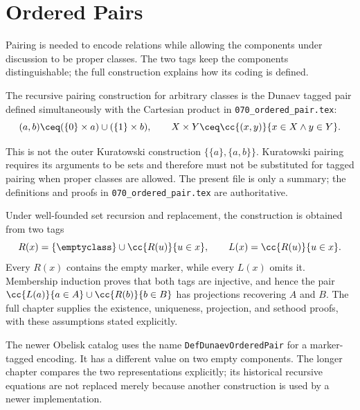 \def\topic{Ordered Pairs: Active Convention}

\section{Ordered Pairs}

Pairing is needed to encode relations while allowing the components under
discussion to be proper classes. The two tags keep the components
distinguishable; the full construction explains how its coding is defined.

The recursive pairing construction for arbitrary classes is the Dunaev tagged
pair defined simultaneously with the Cartesian product in
\texttt{070\_ordered\_pair.tex}:
\[
(a,b)\ceq(\{0\}\times a)\cup(\{1\}\times b),
\qquad
X\times Y\ceq\cc{(x,y)}{x\in X\land y\in Y}.
\]

This is not the outer Kuratowski construction
$\{\{a\},\{a,b\}\}$. Kuratowski pairing requires its arguments to be sets and
therefore must not be substituted for tagged pairing when proper classes are
allowed. The present file is only a summary; the definitions and proofs in
\texttt{070\_ordered\_pair.tex} are authoritative.

Under well-founded set recursion and replacement, the construction is
obtained from two tags
\[
R(x)=\{\emptyclass\}\cup\cc{R(u)}{u\in x},\qquad
L(x)=\cc{R(u)}{u\in x}.
\]
Every $R(x)$ contains the empty marker, while every $L(x)$ omits it.
Membership induction proves that both tags are injective, and hence the
pair $\cc{L(a)}{a\in A}\cup\cc{R(b)}{b\in B}$ has projections recovering
$A$ and $B$. The full chapter supplies the existence, uniqueness, projection,
and sethood proofs, with these assumptions stated explicitly.

The newer Obelisk catalog uses the name \texttt{DefDunaevOrderedPair}
for a marker-tagged encoding. It has a different value on two empty
components. The longer chapter compares the two representations explicitly;
its historical recursive equations are not replaced merely because another
construction is used by a newer implementation.


